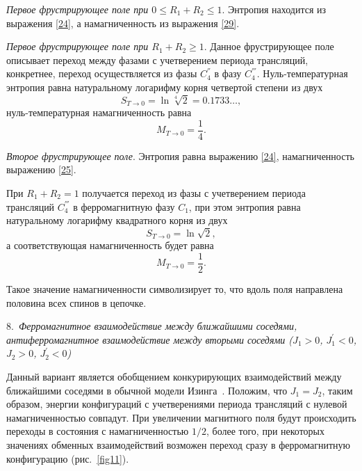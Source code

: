 \emph{Первое фрустрирующее поле при $0\leq R_1+R_2\leq 1$}. Энтропия находится из выражения \eqref{24}, а намагниченность из выражения \eqref{29}.

\emph{Первое фрустрирующее поле при $R_1 + R_2 \geqslant 1$}. Данное фрустрирующее поле описывает переход между фазами с учетверением периода трансляций, конкретнее, переход осуществляется из фазы $C_4^{''}$ в фазу $C_4^{'''}$. Нуль-температурная энтропия равна натуральному логарифму корня четвертой степени из двух
\begin{equation}
S_{T\rightarrow 0} = \ln \sqrt[4]{2} = 0.1733\dots,
\label{30}
\end{equation}
нуль-температурная намагниченность равна
\begin{equation}
M_{T\rightarrow 0} = \frac{1}{4}.
\label{31}
\end{equation}

\emph{Второе фрустрирующее поле}. Энтропия равна выражению \eqref{24}, намагниченность выражению \eqref{25}.

При $R_1 + R_2 = 1$ получается переход из фазы с учетверением периода трансляций $C_4^{'''}$ в ферромагнитную фазу $C_1$, при этом энтропия равна  натуральному логарифму квадратного корня из двух 
\begin{equation}
S_{T\rightarrow 0}=\ln \sqrt{2},
\label{32}
\end{equation}
а соответствующая намагниченность будет равна
\begin{equation}
M_{T\rightarrow 0} = \frac{1}{2}.
\label{33}
\end{equation}

Такое значение намагниченности символизирует то, что вдоль поля направлена половина всех спинов в цепочке.

8.~\emph{Ферромагнитное взаимодействие между ближайшими соседями, антиферромагнитное взаимодействие между вторыми соседями ($J_1>0$, $J_{1}^{'}<0$, $J_{2}>0$, $J_{2}^{'}<0$)}

Данный вариант является обобщением конкурирующих взаимодействий
между ближайшими соседями в обычной модели Изинга~\cite{zarubin2019}. Положим, что $J_1 = J_2$, таким образом, энергии конфигураций с учетверениями периода трансляций с нулевой намагниченностью совпадут. При увеличении магнитного поля будут происходить переходы в состояния с намагниченностью $1/2$, более того, при некоторых значениях обменных взаимодействий возможен переход сразу в ферромагнитную конфигурацию (рис.~\ref{fig11}).

